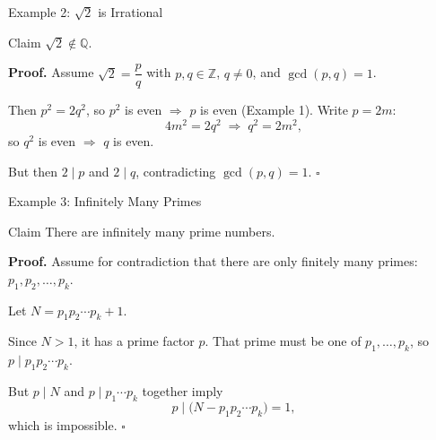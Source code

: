 \documentclass[10pt,aspectratio=169]{beamer}
\begin{document}
\begin{frame}{Example 2: $\sqrt{2}$ is Irrational}
  \begin{block}{Claim}
    $\sqrt{2} \notin \mathbb{Q}$.
  \end{block}

  \pause
  \bigskip
  \textbf{Proof.} Assume $\sqrt{2} = \dfrac{p}{q}$ with $p, q \in \mathbb{Z}$,
  $q \ne 0$, and $\gcd(p, q) = 1$.

  \pause
  \bigskip
  Then $p^2 = 2q^2$, so $p^2$ is even $\Rightarrow$ $p$ is even (Example 1).
  Write $p = 2m$:
  \[
    4m^2 = 2q^2 \;\Longrightarrow\; q^2 = 2m^2,
  \]
  so $q^2$ is even $\Rightarrow$ $q$ is even.

  \bigskip
  But then $2 \mid p$ and $2 \mid q$, contradicting $\gcd(p,q) = 1$. $\square$
\end{frame}

\begin{frame}{Example 3: Infinitely Many Primes}
  \begin{block}{Claim}
    There are infinitely many prime numbers.
  \end{block}

  \pause
  \bigskip
  \textbf{Proof.} Assume for contradiction that there are only finitely many primes:
  $p_1, p_2, \ldots, p_k$.

  \pause
  \bigskip
  Let $N = p_1 p_2 \cdots p_k + 1$.

  \pause
  \bigskip
  Since $N > 1$, it has a prime factor $p$.
  That prime must be one of $p_1, \ldots, p_k$, so $p \mid p_1 p_2 \cdots p_k$.

  \bigskip
  But $p \mid N$ and $p \mid p_1 \cdots p_k$ together imply
  \[
    p \mid \bigl(N - p_1 p_2 \cdots p_k\bigr) = 1,
  \]
  which is impossible. $\square$
\end{frame}
\end{document}
